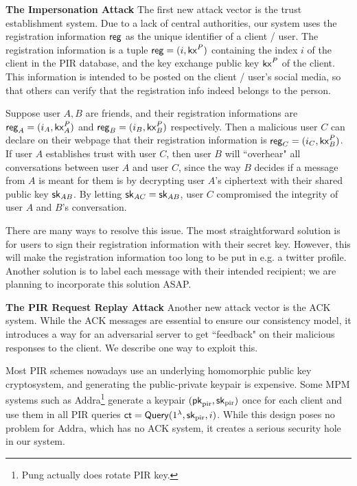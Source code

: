 \textbf{The Impersonation Attack} The first new attack vector is the trust establishment system. Due to a lack of central authorities, our system uses the registration information $\mathsf{reg}$ as the unique identifier of a client / user. The registration information is a tuple $\mathsf{reg} = (i, \mathsf{kx}^P)$ containing the index $i$ of the client in the PIR database, and the key exchange public key $\mathsf{kx}^P$ of the client. This information is intended to be posted on the client / user's social media, so that others can verify that the registration info indeed belongs to the person.

Suppose user $A, B$ are friends, and their registration informations are $\mathsf{reg}_A = (i_A, \mathsf{kx}^P_A)$ and $\mathsf{reg}_B = (i_B, \mathsf{kx}^P_B)$ respectively. Then a malicious user $C$ can declare on their webpage that their registration information is $\mathsf{reg}_C = (i_C, \mathsf{kx}^P_B)$. If user $A$ establishes trust with user $C$, then user $B$ will ``overhear" all conversations between user $A$ and user $C$, since the way $B$ decides if a message from $A$ is meant for them is by decrypting user $A$'s ciphertext with their shared public key ${\mathsf{sk}}_{AB}$. By letting ${\mathsf{sk}}_{AC} = {\mathsf{sk}}_{AB}$, user $C$ compromised the integrity of user $A$ and $B$'s conversation.

There are many ways to resolve this issue. The most straightforward solution is for users to sign their registration information with their secret key. However, this will make the registration information too long to be put in e.g. a twitter profile. Another solution is to label each message with their intended recipient; we are planning to incorporate this solution ASAP.

\textbf{The PIR Request Replay Attack} Another new attack vector is the ACK system. While the ACK messages are essential to ensure our consistency model, it introduces a way for an adversarial server to get ``feedback" on their malicious responses to the client. We describe one way to exploit this.

Most PIR schemes nowadays use an underlying homomorphic public key cryptosystem, and generating the public-private keypair is expensive. Some MPM systems such as Addra\footnote{Pung actually does rotate PIR key.} generate a keypair $(\mathsf{pk}_{\text{pir}}, {\mathsf{sk}}_{\text{pir}})$ once for each client and use them in all PIR queries $\mathsf{ct} = \mathsf{Query}(1^{\lambda}, {\mathsf{sk}}_{\text{pir}}, i)$. While this design poses no problem for Addra, which has no ACK system, it creates a serious security hole in our system. 

